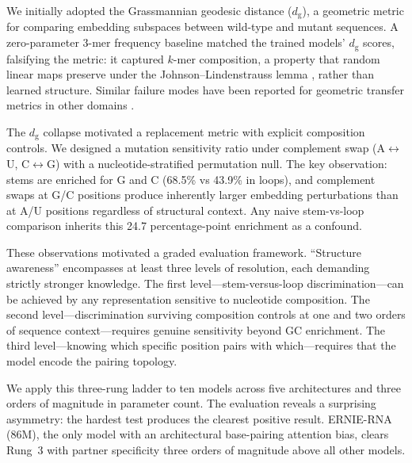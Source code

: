 \documentclass[11pt]{article}
\newcommand{\dg}{d_{\mathrm{g}}}
\begin{document}
We initially adopted the Grassmannian geodesic distance ($\dg$), a
geometric metric for comparing embedding subspaces between wild-type
and mutant sequences.  A zero-parameter 3-mer frequency baseline
matched the trained models' $\dg$ scores, falsifying the metric: it
captured $k$-mer composition, a property that random linear maps
preserve under the Johnson--Lindenstrauss lemma
\citep{johnson1984extensions}, rather than learned structure.  Similar
failure modes have been reported for geometric transfer metrics in
other domains \citep{tower2026boundary}.

The $\dg$ collapse motivated a replacement metric with explicit
composition controls.  We designed a mutation sensitivity ratio under
complement swap (A$\leftrightarrow$U, C$\leftrightarrow$G) with a
nucleotide-stratified permutation null.  The key observation: stems
are enriched for G and C (68.5\% vs 43.9\% in loops), and complement
swaps at G/C positions produce inherently larger embedding
perturbations than at A/U positions regardless of structural context.
Any naive stem-vs-loop comparison inherits this 24.7 percentage-point
enrichment as a confound.

These observations motivated a graded evaluation framework.
``Structure awareness'' encompasses at least three levels of
resolution, each demanding strictly stronger knowledge.  The first
level---stem-versus-loop discrimination---can be achieved by any
representation sensitive to nucleotide composition.  The second
level---discrimination surviving composition controls at one and two
orders of sequence context---requires genuine sensitivity beyond GC
enrichment.  The third level---knowing which specific position pairs
with which---requires that the model encode the pairing topology.

We apply this three-rung ladder to ten models across five
architectures and three orders of magnitude in parameter count.  The
evaluation reveals a surprising asymmetry: the hardest test produces
the clearest positive result.  ERNIE-RNA (86M), the only model with
an architectural base-pairing attention bias, clears Rung~3 with
partner specificity three orders of magnitude above all other models.
\end{document}
